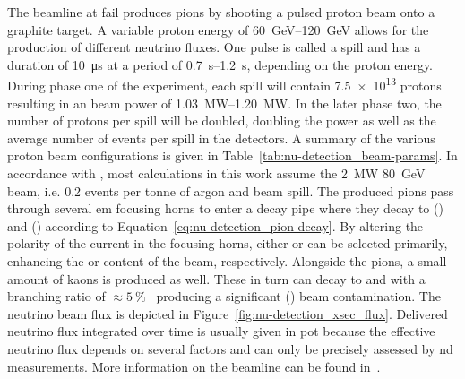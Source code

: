The beamline at \gls{fail} produces pions by shooting a pulsed proton beam onto a graphite target.
A variable proton energy of \SIrange{60}{120}{\giga\electronvolt} allows for the production of different neutrino fluxes.
One pulse is called a spill and has a duration of \SI{10}{\micro\second} at a period of \SIrange{0.7}{1.2}{\second}, depending on the proton energy.
During phase one of the experiment, each spill will contain \num{7.5e13} protons resulting in an beam power of \SIrange{1.03}{1.20}{\mega\watt}.
In the later phase two, the number of protons per spill will be doubled, doubling the power as well as the average number of events per spill in the detectors.
A summary of the various proton beam configurations is given in Table~\ref{tab:nu-detection_beam-params}.
In accordance with \cite{dune2}, most calculations in this work assume the \SI{2}{\mega\watt} \SI{80}{\giga\electronvolt} beam, i.e. \num{0.2} events per tonne of argon and beam spill.
The produced pions pass through several \gls{em} focusing horns to enter a decay pipe where they decay to \Pgmp(\Pgmm) and \Pgngm(\Pagngm) according to Equation~\eqref{eq:nu-detection_pion-decay}.
By altering the polarity of the current in the focusing horns, either \Pgpp or \Pgpm can be selected primarily, enhancing the \Pgngm or \Pagngm content of the beam, respectively.
Alongside the pions, a small amount of kaons is produced as well.
These in turn can decay to \Pgne and \Pagne with a branching ratio of $\approx\SI{5}{\percent}$~\cite{pdg} producing a significant \Pgne (\Pagne) beam contamination.
The neutrino beam flux is depicted in Figure~\ref{fig:nu-detection_xsec_flux}.
Delivered neutrino flux integrated over time is usually given in \gls{pot} because the effective neutrino flux depends on several factors and can only be precisely assessed by \gls{nd} measurements.
More information on the beamline can be found in~\cite{dune2}.

